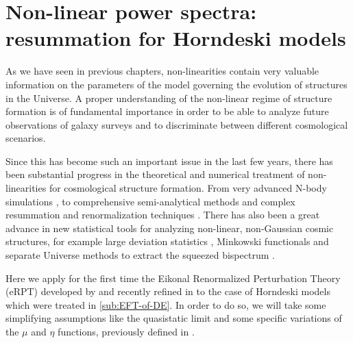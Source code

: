\chapter{Non-linear power spectra: resummation for Horndeski models \label{chap:nonlinear}} %





As we have seen in previous chapters, non-linearities contain very valuable information
on the parameters of the model governing the evolution of structures in the Universe.
A proper understanding of the non-linear regime of structure formation is of fundamental 
importance in order to be able to analyze future observations of galaxy surveys and 
to discriminate between different cosmological scenarios.

Since this has become such an important issue in the last few years, there has been 
substantial progress in the theoretical and numerical
treatment of non-linearities for cosmological structure formation. 
From very advanced N-body simulations
\cite{vogelsberger_introducing_2014, kim2011new, baldi2014cosmic, winther2015fast, adamek2016gevolution, tassev2013solving}, to
comprehensive semi-analytical methods \cite{smith_stable_2003, mead_rapid_2014, heitmann_coyote_2014, 
agarwal_pkann_2012} and complex resummation and renormalization techniques \cite{crocce_mptbreeze:_2012, crocce_renormalized_2006-8, blas_time-sliced_2015,blas_time-sliced_2016, pietroni_coarse-grained_2011,pietroni_flowing_2008,peloso_galilean_2016,matarrese_resumming_2007,anselmi_nonlinear_2012,anselmi_next--leading_2010, senatore_ir-resummed_2014-1,carrasco_effective_2012, taruya_regularized_2014, bernardeau_constructing_2012}. There has also been a great advance in
new statistical tools for analyzing non-linear, non-Gaussian cosmic structures, for example
large deviation statistics \cite{uhlemann_two_2016}, 
Minkowski functionals \cite{novaes_local_2016} and separate Universe methods to extract
the squeezed bispectrum \cite{Chiang:2014oga}.

Here we apply for the first time the Eikonal Renormalized Perturbation Theory (eRPT) developed
by \cite{anselmi_nonlinear_2012, anselmi_next--leading_2010} and recently refined in \cite{peloso_galilean_2016} to the 
case of Horndeski models which were treated in \cref{sub:EFT-of-DE}.
In order to do so, we will take some simplifying assumptions like the quasistatic limit and
some specific variations of the $\mu$ and $\eta$ functions, previously
defined in .

